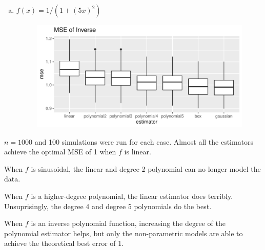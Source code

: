 \documentclass[letterpaper]{article}
\begin{document}
\begin{enumerate}[(a)]
  \item $f(x) = 1/\left(1 + (5x)^2\right)$
    \begin{figure}[h!]
      \centering
      \includegraphics{mse_inverse.pdf}
    \end{figure}
  \end{enumerate}

  $n = 1000$ and 100 simulations were run for each case. Almost all the
  estimators achieve the optimal MSE of 1 when $f$ is linear.

  When $f$ is sinusoidal, the linear and degree 2 polynomial can no longer model
  the data.

  When $f$ is a higher-degree polynomial, the linear estimator does
  terribly. Unsuprisingly, the degree 4 and degree 5 polynomials do the best.

  When $f$ is an inverse polynomial function, increasing the degree of the
  polynomial estimator helps, but only the non-parametric models are able to
  achieve the theoretical best error of 1.
\end{document}
